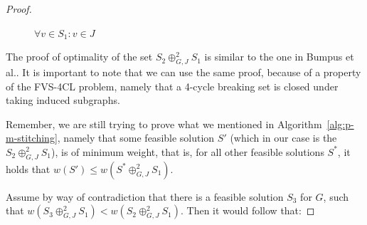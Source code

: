 \begin{proof}
\begin{enumerate}
\begin{figure}[H]
\begin{minipage}{0.49\textwidth}
            \caption{$\forall v \in S_1: v \in J$}
            \label{fig:fourth-figure}
        \end{minipage}
    \end{figure}

\end{enumerate}

 The proof of optimality of the set $S_2 \oplus^{2}_{G,J} S_1$ is similar to the one in 
Bumpus et al.\cite[Lemma 3.2]{bumpus_et_al:LIPIcs.SWAT.2024.19}. It is important to note 
that we can use the same proof, because of a property of the FVS-4CL problem, namely that 
a 4-cycle breaking set is closed under taking induced subgraphs.

 Remember, we are still trying to prove what we mentioned in Algorithm~\ref{alg:p-m-stitching},
namely that some feasible solution $S'$ (which in our case is the $S_2 \oplus^{2}_{G,J} S_1$), is of minimum weight,
that is, for all other feasible solutions $S^{*}$, it holds that $w(S') \leq w(S^{*} \oplus^{2}_{G,J} S_1)$.

Assume by way of contradiction that there is a feasible solution $S_3$ for $G$,
such that $w(S_3 \oplus^{2}_{G,J} S_1) < w(S_2 \oplus^{2}_{G,J} S_1)$. Then it would follow that:


\end{proof}
